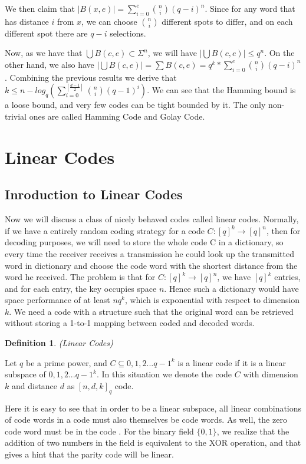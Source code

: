 \documentclass{article}
\newtheorem{Definition}{Definition}
\begin{document}
We then claim that $|B(x,e)| = \sum_{i=0}^{e} {n \choose i}(q-i)^n$. Since for any word that has distance $i$ from $x$, we can choose ${n \choose i}$ different spots to differ, and on each different spot there are $q-i$ selections.

Now, as we have that $\bigcup B(c,e) \subset \Sigma^n$, we will have $|\bigcup B(c,e)| \le q^n$. On the other hand, we also have $|\bigcup B(c,e)| = \sum B(c,e) = q^k* \sum_{i=0}^{e} {n \choose i}(q-i)^n$. Combining the previous results we derive that $k \le n - log_q(\sum_{i=0}^{[\frac{d-1}{2}]}{n \choose i} (q-1)^i)$. We can see that the Hamming bound is a loose bound, and very few codes can be tight bounded by it. The only non-trivial ones are called Hamming Code and Golay Code.\\
\section{Linear Codes}
\subsection{Inroduction to Linear Codes}
Now we will discuss a class of nicely behaved codes called linear codes. Normally, if we have a entirely random coding strategy for a code $C:[q]^k \rightarrow [q]^n$, then for decoding purposes, we will need to store the whole code C in a dictionary, so every time the receiver receives a transmission he could look up the transmitted word in dictionary and choose the code word with the shortest distance from the word he received. The problem is that for $C:[q]^k \rightarrow [q]^n$, we have $[q]^k$ entries, and for each entry, the key occupies space $n$. Hence such a dictionary would have space performance of at least $nq^k$, which is exponential with respect to dimension $k$. We need a code with a structure such that the original word can be retrieved without storing a 1-to-1 mapping between coded and decoded words.
\begin{Definition}(Linear Codes)\end{Definition}
\noindent Let $q$ be a prime power, and $C \subseteq {0,1,2...q-1}^k$ is a linear code if it is a linear subspace of ${0,1,2...q-1}^k$. In this situation we denote the code $C$ with dimension $k$ and distance $d$ as $[n,d,k]_q$ code.

Here it is easy to see that in order to be a linear subspace, all linear combinations of code words in a code must also themselves be code words. As well, the zero code word must be in the code . For the binary field $\{0,1\}$, we realize that the addition of two numbers in the field is equivalent to the XOR operation, and that gives a hint that the parity code will be linear.
\end{document}

